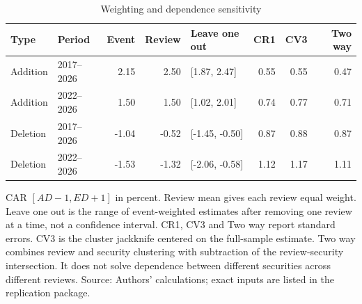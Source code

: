 \begin{table}[!htbp]
\centering
\caption{Weighting and dependence sensitivity}\label{tab:dependence}
\small
\setlength{\tabcolsep}{5pt}
\begin{tabular}{llrrlrrr}
\toprule
Type & Period & Event & Review & Leave one out & CR1 & CV3 & Two way \\
\midrule
Addition & 2017--2026 & 2.15 & 2.50 & [1.87, 2.47] & 0.55 & 0.55 & 0.47 \\
Addition & 2022--2026 & 1.50 & 1.50 & [1.02, 2.01] & 0.74 & 0.77 & 0.71 \\
Deletion & 2017--2026 & -1.04 & -0.52 & [-1.45, -0.50] & 0.87 & 0.88 & 0.87 \\
Deletion & 2022--2026 & -1.53 & -1.32 & [-2.06, -0.58] & 1.12 & 1.17 & 1.11 \\
\bottomrule
\end{tabular}
\begin{minipage}{\linewidth}\footnotesize\vspace{5pt}
CAR $[AD-1,ED+1]$ in percent. Review mean gives each review equal weight. Leave one out is the range of event-weighted estimates after removing one review at a time, not a confidence interval. CR1, CV3 and Two way report standard errors. CV3 is the cluster jackknife centered on the full-sample estimate. Two way combines review and security clustering with subtraction of the review-security intersection. It does not solve dependence between different securities across different reviews. Source: Authors' calculations; exact inputs are listed in the replication package.
\end{minipage}
\end{table}

